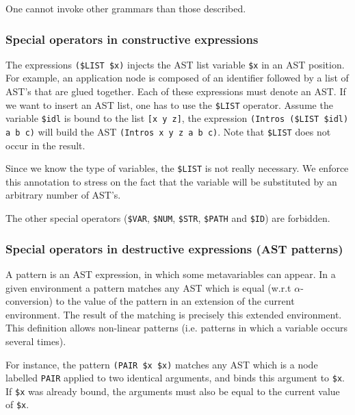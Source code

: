 \Warning
One cannot invoke other grammars than those described.

\subsubsection{Special operators in constructive expressions}

The expressions \verb+($LIST $x)+ injects the AST list variable
{\tt\$x} in an AST position. For example, an application node is
composed of an identifier followed by a list of AST's that are glued
together. Each of these expressions must denote an AST. If we want to
insert an AST list, one has to use the \verb+$LIST+ operator. Assume
the variable \verb+$idl+ is bound to the list \verb+[x y z]+, the
expression \verb+(Intros ($LIST $idl) a b c)+ will build the AST
\verb+(Intros x y z a b c)+. Note that \verb+$LIST+ does not occur in
the result.

Since we know the type of variables, the \verb+$LIST+ is not really
necessary. We enforce this annotation to stress on the fact that the
variable will be substituted by an arbitrary number of AST's.

The other special operators ({\tt\$VAR}, {\tt\$NUM}, {\tt\$STR},
{\tt\$PATH} and {\tt\$ID}) are forbidden.

\subsubsection{Special operators in destructive expressions (AST patterns)}
\label{patternsyntax}


A pattern is an AST expression, in which some metavariables can
appear. In a given environment a pattern matches any AST which is
equal (w.r.t $\alpha$-conversion) to the value of the pattern in an
extension of the current environment. The result of the matching is
precisely this extended environment. This definition allows
non-linear patterns (i.e. patterns in which a variable occurs several
times).

For instance, the pattern \verb+(PAIR $x $x)+ matches any AST which is
a node labelled {\tt PAIR} applied to two identical arguments, and
binds this argument to {\tt\$x}. If {\tt\$x} was already bound, the
arguments must also be equal to the current value of {\tt\$x}.

